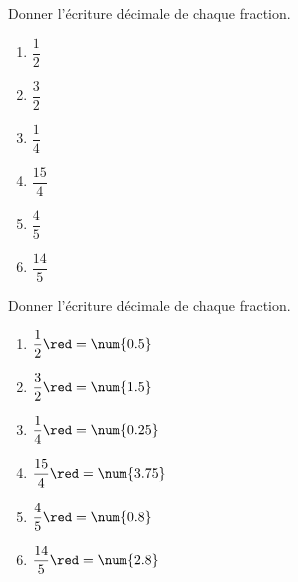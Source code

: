 \begin{exercice*}
    Donner l'écriture décimale de chaque fraction.
    \begin{multicols}{3}
        \begin{spacing}{1.5}
            \begin{enumerate}
                \item $\dfrac{1}{2}$
                \item $\dfrac{3}{2}$
                \item $\dfrac{1}{4}$
                \item $\dfrac{15}{4}$
                \item $\dfrac{4}{5}$
                \item $\dfrac{14}{5}$
            \end{enumerate}           
        \end{spacing}
    \end{multicols}
\end{exercice*}
\begin{corrige}
    Donner l'écriture décimale de chaque fraction.
    \begin{multicols}{3}
        \begin{spacing}{1.5}
            \begin{enumerate}
                \item $\dfrac{1}{2} {\red = \num{0.5}}$
                \item $\dfrac{3}{2} {\red = \num{1.5}}$
                \item $\dfrac{1}{4} {\red = \num{0.25}}$
                \item $\dfrac{15}{4}{\red = \num{3.75}}$
                \item $\dfrac{4}{5} {\red = \num{0.8}}$
                \item $\dfrac{14}{5}{\red = \num{2.8}}$
            \end{enumerate}           
        \end{spacing}
    \end{multicols}
\end{corrige}

